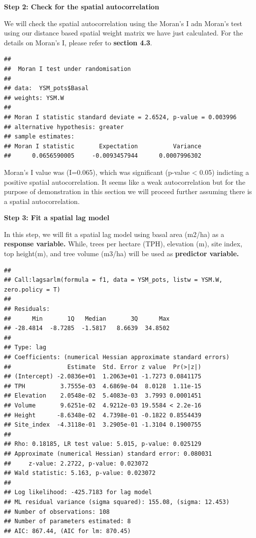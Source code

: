 \documentclass[
]{book}
\begin{document}
\textbf{Step 2: Check for the spatial autocorrelation}

We will check the spatial autocorrelation using the Moran's I adn Moran's test using our distance based spatial weight matrix \citep{getis_constructing_2010} we have just calculated. For the details on Moran's I, please refer to \textbf{section 4.3}.

\begin{verbatim}
## 
##  Moran I test under randomisation
## 
## data:  YSM_pots$Basal  
## weights: YSM.W    
## 
## Moran I statistic standard deviate = 2.6524, p-value = 0.003996
## alternative hypothesis: greater
## sample estimates:
## Moran I statistic       Expectation          Variance 
##      0.0656590005     -0.0093457944      0.0007996302
\end{verbatim}

Moran's I value was (I=0.065), which was significant (p-value \textless{} 0.05) indicting a positive spatial autocorrelation. It seems like a weak autocorrelation but for the purpose of demonstration in this section we will proceed further assuming there is a spatial autocorrelation.

\textbf{Step 3: Fit a spatial lag model}

In this step, we will fit a spatial lag model using basal area (m2/ha) as a \textbf{response variable.} While, trees per hectare (TPH), elevation (m), site index, top height(m), and tree volume (m3/ha) will be used as \textbf{predictor variable.}

\begin{verbatim}
## 
## Call:lagsarlm(formula = f1, data = YSM_pots, listw = YSM.W, zero.policy = T)
## 
## Residuals:
##      Min       1Q   Median       3Q      Max 
## -28.4814  -8.7285  -1.5817   8.6639  34.8502 
## 
## Type: lag 
## Coefficients: (numerical Hessian approximate standard errors) 
##                Estimate  Std. Error z value  Pr(>|z|)
## (Intercept) -2.0836e+01  1.2063e+01 -1.7273 0.0841175
## TPH          3.7555e-03  4.6869e-04  8.0128  1.11e-15
## Elevation    2.0548e-02  5.4083e-03  3.7993 0.0001451
## Volume       9.6251e-02  4.9212e-03 19.5584 < 2.2e-16
## Height      -8.6348e-02  4.7398e-01 -0.1822 0.8554439
## Site_index  -4.3118e-01  3.2905e-01 -1.3104 0.1900755
## 
## Rho: 0.18185, LR test value: 5.015, p-value: 0.025129
## Approximate (numerical Hessian) standard error: 0.080031
##     z-value: 2.2722, p-value: 0.023072
## Wald statistic: 5.163, p-value: 0.023072
## 
## Log likelihood: -425.7183 for lag model
## ML residual variance (sigma squared): 155.08, (sigma: 12.453)
## Number of observations: 108 
## Number of parameters estimated: 8 
## AIC: 867.44, (AIC for lm: 870.45)
\end{verbatim}
\end{document}
